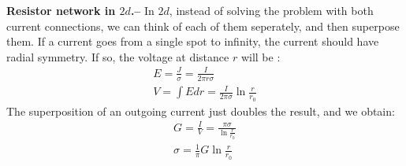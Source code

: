 \documentclass[onecolumn,fleqn,notitlepage,secnumarabic]{revtex4}
\begin{document}
{\bf Resistor network in $2d$.--} In $2d$, instead of solving the problem with both current connections, we can think of each of them seperately, and then superpose them. If a current goes from a single spot to infinity, the current should have radial symmetry. If so, the voltage at distance $r$ will be :
\begin{align}
  E = \frac{J}{\sigma} = \frac{I}{2\pi r\sigma} \\
  V = \int E dr = \frac{I}{2\pi\sigma}\ln\frac{r}{r_0}
\end{align}
The superposition of an outgoing current just doubles the result, and we obtain:
\begin{align}
    G = \frac{I}{V} = \frac{\pi\sigma }{\ln\frac{r}{r_0}}  \\
    \sigma = \frac{1}{\pi}G\ln\frac{r}{r_0}
\end{align}


%

\end{document}
